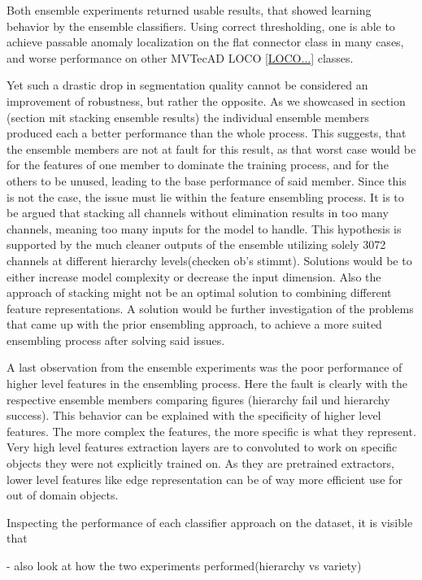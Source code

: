 Both ensemble experiments returned usable results, that showed learning behavior by the ensemble classifiers. Using correct thresholding, one is able to achieve passable anomaly localization on the flat connector class in many cases, and worse performance on other MVTecAD LOCO \ref{LOCO...} classes.

Yet such a drastic drop in segmentation quality cannot be considered an improvement of robustness, but rather the opposite. As we showcased in section (section mit stacking ensemble results) the individual ensemble members produced each a better performance than the whole process. 
This suggests, that the ensemble members are not at fault for this result, as that worst case would be for the features of one member to dominate the training process, and for the others to be unused, leading to the base performance of said member. Since this is not the case, the issue must lie within the feature ensembling process. It is to be argued that stacking all channels without elimination results in too many channels, meaning too many inputs for the model to handle. This hypothesis is supported by the much cleaner outputs of the ensemble utilizing solely 3072 channels at different hierarchy levels(checken ob's stimmt). Solutions would be to either increase model complexity or decrease the input dimension. Also the approach of stacking might not be an optimal solution to combining different feature representations. A solution would be further investigation of the problems that came up with the prior ensembling approach, to achieve a more suited ensembling process after solving said issues.
\newline

A last observation from the ensemble experiments was the poor performance of higher level features in the ensembling process. 
Here the fault is clearly with the respective ensemble members comparing figures (hierarchy fail und hierarchy success). This behavior can be explained with the specificity of higher level features. The more complex the features, the more specific is what they represent. Very high level features extraction layers are to convoluted to work on specific objects they were not explicitly trained on. As they are pretrained extractors, lower level features like edge representation can be of way more efficient use for out of domain objects.
\newline

Inspecting the performance of each classifier approach on the dataset, it is visible that

- also look at how the two experiments performed(hierarchy vs variety)\newline


